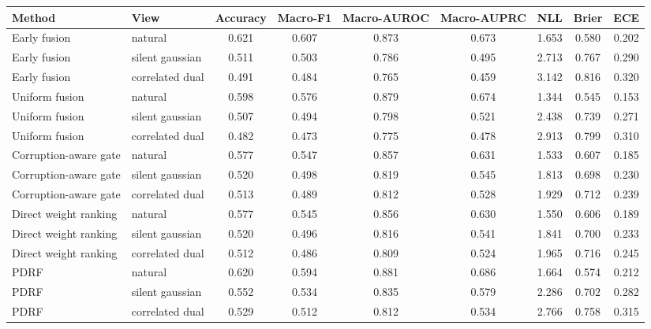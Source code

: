 \begin{tabular}{llccccccc}
\toprule
Method & View & Accuracy & Macro-F1 & Macro-AUROC & Macro-AUPRC & NLL & Brier & ECE \\
\midrule
Early fusion & natural & 0.621 & 0.607 & 0.873 & 0.673 & 1.653 & 0.580 & 0.202 \\
Early fusion & silent gaussian & 0.511 & 0.503 & 0.786 & 0.495 & 2.713 & 0.767 & 0.290 \\
Early fusion & correlated dual & 0.491 & 0.484 & 0.765 & 0.459 & 3.142 & 0.816 & 0.320 \\
Uniform fusion & natural & 0.598 & 0.576 & 0.879 & 0.674 & 1.344 & 0.545 & 0.153 \\
Uniform fusion & silent gaussian & 0.507 & 0.494 & 0.798 & 0.521 & 2.438 & 0.739 & 0.271 \\
Uniform fusion & correlated dual & 0.482 & 0.473 & 0.775 & 0.478 & 2.913 & 0.799 & 0.310 \\
Corruption-aware gate & natural & 0.577 & 0.547 & 0.857 & 0.631 & 1.533 & 0.607 & 0.185 \\
Corruption-aware gate & silent gaussian & 0.520 & 0.498 & 0.819 & 0.545 & 1.813 & 0.698 & 0.230 \\
Corruption-aware gate & correlated dual & 0.513 & 0.489 & 0.812 & 0.528 & 1.929 & 0.712 & 0.239 \\
Direct weight ranking & natural & 0.577 & 0.545 & 0.856 & 0.630 & 1.550 & 0.606 & 0.189 \\
Direct weight ranking & silent gaussian & 0.520 & 0.496 & 0.816 & 0.541 & 1.841 & 0.700 & 0.233 \\
Direct weight ranking & correlated dual & 0.512 & 0.486 & 0.809 & 0.524 & 1.965 & 0.716 & 0.245 \\
PDRF & natural & 0.620 & 0.594 & 0.881 & 0.686 & 1.664 & 0.574 & 0.212 \\
PDRF & silent gaussian & 0.552 & 0.534 & 0.835 & 0.579 & 2.286 & 0.702 & 0.282 \\
PDRF & correlated dual & 0.529 & 0.512 & 0.812 & 0.534 & 2.766 & 0.758 & 0.315 \\
\bottomrule
\end{tabular}
